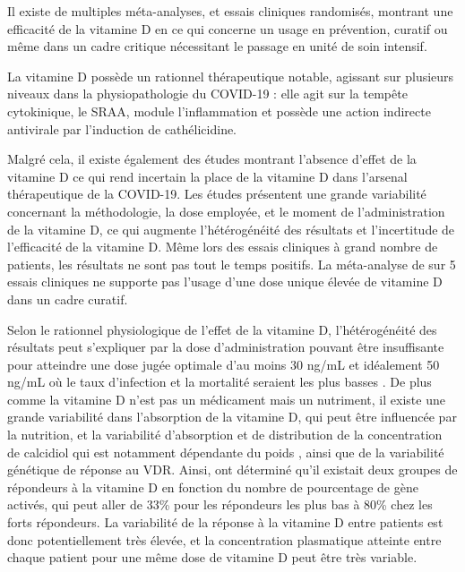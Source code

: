 \documentclass[
  a4paper,
  DIV=11,
  numbers=noendperiod,
  listof=totoc]{scrreprt}
\begin{document}
\textcite{Grant.2022.nutrients}

Il existe de multiples méta-analyses, et essais cliniques randomisés,
montrant une efficacité de la vitamine D en ce qui concerne un usage en
prévention, curatif ou même dans un cadre critique nécessitant le
passage en unité de soin intensif.

La vitamine D possède un rationnel thérapeutique notable, agissant sur
plusieurs niveaux dans la physiopathologie du COVID-19 : elle agit sur
la tempête cytokinique, le \ac{SRAA}, module l'inflammation et possède
une action indirecte antivirale par l'induction de cathélicidine.

Malgré cela, il existe également des études montrant l'absence d'effet
de la vitamine D ce qui rend incertain la place de la vitamine D dans
l'arsenal thérapeutique de la COVID-19. Les études présentent une grande
variabilité concernant la méthodologie, la dose employée, et le moment
de l'administration de la vitamine D, ce qui augmente l'hétérogénéité
des résultats et l'incertitude de l'efficacité de la vitamine D. Même
lors des essais cliniques à grand nombre de patients, les résultats ne
sont pas tout le temps positifs. La méta-analyse de
\textcite{Zhong.2024} sur 5 essais cliniques ne supporte pas l'usage
d'une dose unique élevée de vitamine D dans un cadre curatif.

Selon le rationnel physiologique de l'effet de la vitamine D,
l'hétérogénéité des résultats peut s'expliquer par la dose
d'administration pouvant être insuffisante pour atteindre une dose jugée
optimale d'au moins 30 ng/mL et idéalement 50 ng/mL où le taux
d'infection et la mortalité seraient les plus basses
\autocite{Wimalawansa.2022,Kaufman.2020,Borsche.2021}. De plus comme la
vitamine D n'est pas un médicament mais un nutriment, il existe une
grande variabilité dans l'absorption de la vitamine D, qui peut être
influencée par la nutrition, et la variabilité d'absorption et de
distribution de la concentration de calcidiol qui est notamment
dépendante du poids \autocite{Ekwaru.2014}, ainsi que de la variabilité
génétique de réponse au VDR. Ainsi, \textcite{Vukić.2015} ont déterminé
qu'il existait deux groupes de répondeurs à la vitamine D en fonction du
nombre de pourcentage de gène activés, qui peut aller de 33\% pour les
répondeurs les plus bas à 80\% chez les forts répondeurs. La variabilité
de la réponse à la vitamine D entre patients est donc potentiellement
très élevée, et la concentration plasmatique atteinte entre chaque
patient pour une même dose de vitamine D peut être très variable.
\end{document}
